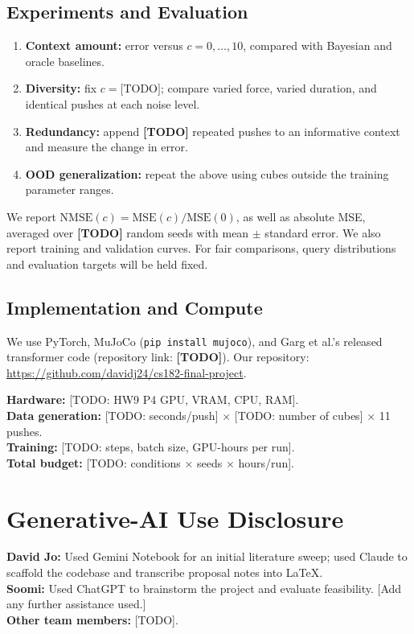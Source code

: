 \documentclass[12pt]{article}
\begin{document}
\subsection{Experiments and Evaluation}
\begin{enumerate}
    \item \textbf{Context amount:} error versus $c=0,\ldots,10$, compared with Bayesian and oracle baselines.
    \item \textbf{Diversity:} fix $c=\text{[TODO]}$; compare varied force, varied duration, and identical pushes at each noise level.
    \item \textbf{Redundancy:} append \textbf{[TODO]} repeated pushes to an informative context and measure the change in error.
    \item \textbf{OOD generalization:} repeat the above using cubes outside the training parameter ranges.
\end{enumerate}
We report $\mathrm{NMSE}(c)=\mathrm{MSE}(c)/\mathrm{MSE}(0)$, as well as absolute MSE, averaged over \textbf{[TODO]} random seeds with mean $\pm$ standard error. We also report training and validation curves. For fair comparisons, query distributions and evaluation targets will be held fixed.

\subsection{Implementation and Compute}
We use PyTorch, MuJoCo (\texttt{pip install mujoco}), and Garg et al.'s released transformer code (repository link: \textbf{[TODO]}). Our repository: \url{https://github.com/davidj24/cs182-final-project}.

\noindent\textbf{Hardware:} [TODO: HW9 P4 GPU, VRAM, CPU, RAM].\\
\textbf{Data generation:} [TODO: seconds/push] $\times$ [TODO: number of cubes] $\times$ 11 pushes.\\
\textbf{Training:} [TODO: steps, batch size, GPU-hours per run].\\
\textbf{Total budget:} [TODO: conditions $\times$ seeds $\times$ hours/run].

\clearpage
\appendix
\section{Generative-AI Use Disclosure}
\textbf{David Jo:} Used Gemini Notebook for an initial literature sweep; used Claude to scaffold the codebase and transcribe proposal notes into LaTeX.\\
\textbf{Soomi:} Used ChatGPT to brainstorm the project and evaluate feasibility. [Add any further assistance used.]\\
\textbf{Other team members:} [TODO].
\end{document}
